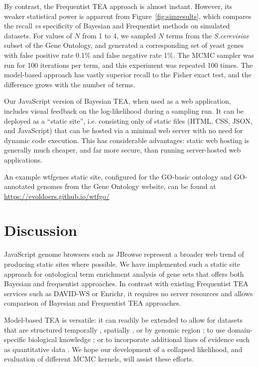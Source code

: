 By contrast, the Frequentist TEA approach is almost instant.
However, its weaker statistical power is apparent from Figure~\ref{fig:simresults},
which compares the recall {\em vs} specificity of Bayesian and Frequentist methods
on simulated datasets. For values of $N$ from 1 to 4, we sampled $N$ terms
from the {\em S.cerevisiae} subset of the Gene Ontology,
and generated a corresponding set of yeast genes with false positive rate 0.1\% and false negative rate 1\%.
The MCMC sampler was run for 100 iterations per term, and this experiment was repeated 100 times.
The model-based approach has vastly superior recall to the Fisher exact test, and the difference
grows with the number of terms.

Our JavaScript version of Bayesian TEA, when used as a web application, includes visual feedback on the log-likelihood during a sampling run.
It can be deployed as a ``static site'',
i.e. consisting only of static files (HTML, CSS, JSON, and JavaScript) that can be hosted via a minimal web server with no need for dynamic code execution.
This has considerable advantages: static web hosting is generally much cheaper, and far more secure, than running server-hosted web applications.

An example wtfgenes static site, configured for the GO-basic ontology and GO-annotated genomes from the Gene Ontology website,
can be found at \url{https://evoldoers.github.io/wtfgo/}

\section*{Discussion}

JavaScript genome browsers such as JBrowse \citep{pmid27072794}
represent a broader web trend of producing static sites where possible.
We have implemented such a static site approach for ontological term enrichment analysis of gene sets that offers both Bayesian and frequentist approaches.
In contrast with existing Frequentist TEA services such as DAVID-WS or Enrichr,
it requires no server resources and allows comparison of Bayesian and Frequentist TEA approaches.

Model-based TEA is versatile: it can readily be extended
to allow for datasets that are structured
temporally \citep{pmid26111374},
spatially \citep{pmid26877824},
or by genomic region \citep{pmid20436461};
to use domain-specific biological knowledge \citep{pmid24675718};
or to incorporate additional lines of evidence such as quantitative data \citep{pmid21599902}.
We hope our development of a collapsed likelihood, and evaluation of different MCMC kernels, will assist these efforts.

